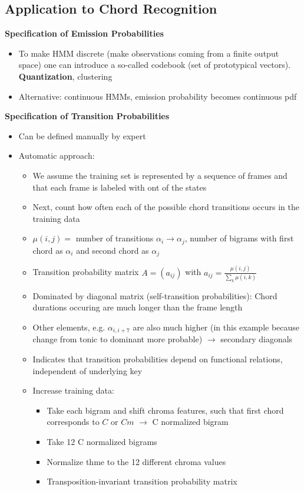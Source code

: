 \documentclass{scrartcl}
\newcommand{\ffrac}[2]{\ensuremath{\frac{\displaystyle #1}{\displaystyle #2}}}
\begin{document}
\subsection*{Application to Chord Recognition}
\textbf{Specification of Emission Probabilities}
\begin{itemize}
    \item
        To make HMM discrete (make observations coming from a finite output space) one can introduce a so-called codebook (set of prototypical vectors). \textbf{Quantization}, clustering
    \item
        Alternative: continuous HMMs, emission probability becomes continuous pdf
\end{itemize}
\textbf{Specification of Transition Probabilities}
\begin{itemize}
    \item
        Can be defined manually by expert
    \item
        Automatic approach:
        \begin{itemize}
            \item
                We assume the training set is represented by a sequence of frames and that each frame is labeled with ont of the states
            \item
                Next, count how often each of the possible chord transitions occurs in the training data
            \item
                $\mu(i,j) = $ number of transitions $\alpha_i \rightarrow \alpha_j$, number of bigrams with first chord as $\alpha_i$ and second chord as $\alpha_j$
            \item
                Transition probability matrix $A = (a_{ij})$ with $a_{ij} = \ffrac{\mu(i,j)}{\sum_k \mu(i,k)}$
            \item
                Dominated by diagonal matrix (self-transition probabilities): Chord durations occuring are much longer than the frame length
            \item
                Other elements, e.g. $\alpha_{i, i+7}$ are also much higher (in this example because change from tonic to dominant more probable) $\rightarrow$ secondary diagonals
            \item
                Indicates that transition probabilities depend on functional relations, independent of underlying key
            \item
                Increase training data:
                \begin{itemize}
                    \item
                        Take each bigram and shift chroma features, such that first chord corresponds to $C$ or $Cm$ $\rightarrow$ C normalized bigram
                    \item
                        Take 12 C normalized bigrams
                    \item
                        Normalize thme to the 12 different chroma values
                    \item
                        Transposition-invariant transition probability matrix
                \end{itemize}


\end{itemize}
\end{itemize}
\end{document}
